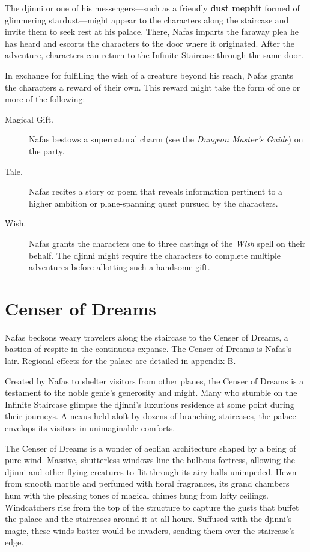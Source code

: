 \documentclass[10pt,a4paper,twoside,bg=print,twocolumn,openany,nodeprecatedcode]{dndbook}
\begin{document}
The djinni or one of his messengers—such as a friendly \textbf{dust mephit} formed of glimmering stardust—might appear to the characters along the staircase and invite them to seek rest at his palace. There, Nafas imparts the faraway plea he has heard and escorts the characters to the door where it originated. After the adventure, characters can return to the Infinite Staircase through the same door.

In exchange for fulfilling the wish of a creature beyond his reach, Nafas grants the characters a reward of their own. This reward might take the form of one or more of the following:


\begin{description}
\item[Magical Gift.]
Nafas bestows a supernatural charm (see the \textit{Dungeon Master's Guide}) on the party.
\item[Tale.]
Nafas recites a story or poem that reveals information pertinent to a higher ambition or plane-spanning quest pursued by the characters.
\item[Wish.]
Nafas grants the characters one to three castings of the \textit{Wish} spell on their behalf. The djinni might require the characters to complete multiple adventures before allotting such a handsome gift.
\end{description}

\section{Censer of Dreams}
Nafas beckons weary travelers along the staircase to the Censer of Dreams, a bastion of respite in the continuous expanse. The Censer of Dreams is Nafas's lair. Regional effects for the palace are detailed in appendix B.

Created by Nafas to shelter visitors from other planes, the Censer of Dreams is a testament to the noble genie's generosity and might. Many who stumble on the Infinite Staircase glimpse the djinni's luxurious residence at some point during their journeys. A nexus held aloft by dozens of branching staircases, the palace envelops its visitors in unimaginable comforts.

The Censer of Dreams is a wonder of aeolian architecture shaped by a being of pure wind. Massive, shutterless windows line the bulbous fortress, allowing the djinni and other flying creatures to flit through its airy halls unimpeded. Hewn from smooth marble and perfumed with floral fragrances, its grand chambers hum with the pleasing tones of magical chimes hung from lofty ceilings. Windcatchers rise from the top of the structure to capture the gusts that buffet the palace and the staircases around it at all hours. Suffused with the djinni's magic, these winds batter would-be invaders, sending them over the staircase's edge.
\end{document}

